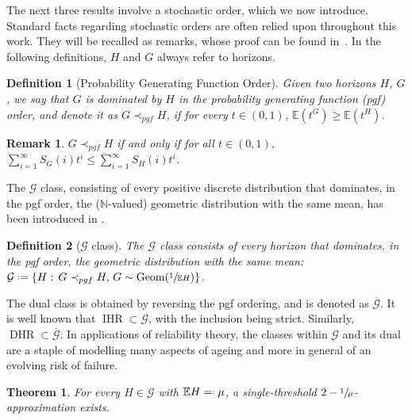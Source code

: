 \documentclass[11pt, a4paper, twoside]{article}
\newcommand*{\defeq}{\mathrel{\vcenter{\baselineskip0.5ex \lineskiplimit0pt
			\hbox{\scriptsize.}\hbox{\scriptsize.}}}=}
\newcommand*{\eqdef}{=\mathrel{\vcenter{\baselineskip0.5ex\lineskiplimit0pt
			\hbox{\scriptsize.}\hbox{\scriptsize.} }}}
\newcommand{\NN}{\mathbb{N}}
\newcommand{\EE}{\mathbb{E}}
\newcommand{\PGF}{\mathcal{G}}
\newcommand{\PGFd}{\overline{\mathcal{G}}}
\DeclareMathOperator{\Geom}{Geom}
\DeclareMathOperator{\IHR}{IHR}
\DeclareMathOperator{\DHR}{DHR}
\newtheorem{theorem}{Theorem}[section]
\newtheorem{remark}{Remark}[section]
\newtheorem{definition}{Definition}[section]
\numberwithin{equation}{section}
\begin{document}
	The next three results involve a stochastic order, which we now introduce. Standard facts regarding stochastic orders are often relied upon throughout this work. They will be recalled as remarks, whose proof can be found in~\cite{ShakShan07}. In the following definitions, $H$ and $G$ always refer to horizons. 
	\begin{definition}[Probability Generating Function Order]
		Given two horizons $H$, $G$, we say that $G$ is dominated by $H$ in the \emph{probability generating function (pgf) order}, and denote it as $G\prec_{pgf} H$, if for every $t\in(0,1)$, $\EE\left( t^G\right)\ge\EE\left( t^H\right)$.
	\end{definition}
	\begin{remark}
		$G\prec_{pgf} H$ if and only if for all $t\in(0,1)$, $\sum_{i=1}^\infty S_G(i)t^i\le\sum_{i=1}^\infty S_H(i)t^i$.
	\end{remark}
	The $\PGF$ class, consisting of every positive discrete distribution that dominates, in the pgf order, the ($\NN$-valued) geometric distribution with the same mean, has been introduced in \cite{Klef83a}.
	\begin{definition}[$\PGF$ class]\label{Gdef}
		The $\PGF$ class consists of every horizon that dominates, in the pgf order, the geometric distribution with the same mean: $\PGF\defeq\{H:\, G\prec_{pgf} H,\, G\sim\Geom(\sfrac{1}{\EE H})\}$.
	\end{definition}
	The dual class is obtained by reversing the pgf ordering, and is denoted as $\PGFd$. It is well known that $\IHR\subset\PGF$, with the inclusion being strict. Similarly, $\DHR\subset\PGFd$. In applications of reliability theory, the classes within $\mathcal{G}$ and its dual are a staple of modelling many aspects of ageing and more in general of an evolving risk of failure.
	\begin{theorem}\label{Ghorizon}
		For every $H\in\PGF$ with $\EE H\eqdef\mu$, a single-threshold $2-\sfrac{1}{\mu}$-approximation exists.
	\end{theorem}
\end{document}
